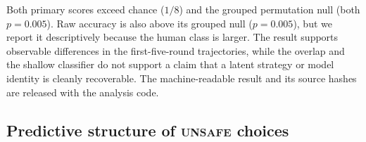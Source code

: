 \documentclass[sigconf,anonymous]{aamas}
\newcommand{\Unsafe}{\textsc{unsafe}}
\begin{document}
\begin{table}[t]
    \caption{Dyad/race-grouped population-identity diagnostic on 760 complete
    first-five-round trajectories. The human population has 340 trajectories
    and each of the seven listed checkpoints has 60; the classes are therefore
    imbalanced, so balanced accuracy and macro-F1 are primary. The null interval
    is the 2.5--97.5 percentile range over grouped label permutations.}
    \label{tab:population-identity}
    \centering
    \scriptsize
    \setlength{\tabcolsep}{3pt}
\end{table}

Both primary scores exceed chance ($1/8$) and the grouped permutation null
(both $p=0.005$). Raw accuracy is also above its grouped null ($p=0.005$),
but we report it descriptively because the human class is larger. The result
supports observable differences in the first-five-round trajectories, while
the overlap and the shallow classifier do not support a claim that a latent
strategy or model identity is cleanly recoverable. The machine-readable
result and its source hashes are released with the analysis code.

\subsection{Predictive structure of \Unsafe{} choices}
\label{app:predictive-structure}
\end{document}
